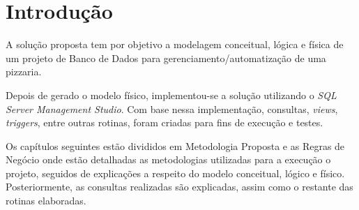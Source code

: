 \documentclass[
	12pt,				%
	openright,			%
	oneside,			%
	a4paper,			%
	chapter=TITLE,		%
	section=TITLE,		%
	english,			%
	brazil				%
	]{abntex2}
\begin{document}


\tableofcontents*
\cleardoublepage

\textual

\chapter*[Introdução]{Introdução}
    A solução proposta tem por objetivo a modelagem conceitual, lógica e física de um projeto de Banco de Dados
    para gerenciamento/automatização de uma pizzaria. 

    Depois de gerado o modelo físico, implementou-se a solução utilizando o \textit{SQL Server Management Studio}. 
    Com base nessa implementação, consultas, \textit{views}, \textit{triggers}, entre outras rotinas, foram criadas para 
    fins de execução e testes.
    
    Os capítulos seguintes estão divididos em Metodologia Proposta e as Regras de Negócio onde estão detalhadas as metodologias utilizadas para a 
    execução o projeto, seguidos de explicações a respeito do modelo conceitual, lógico e físico. Posteriormente, 
    as consultas realizadas são explicadas, assim como o restante das rotinas elaboradas.
\end{document}

